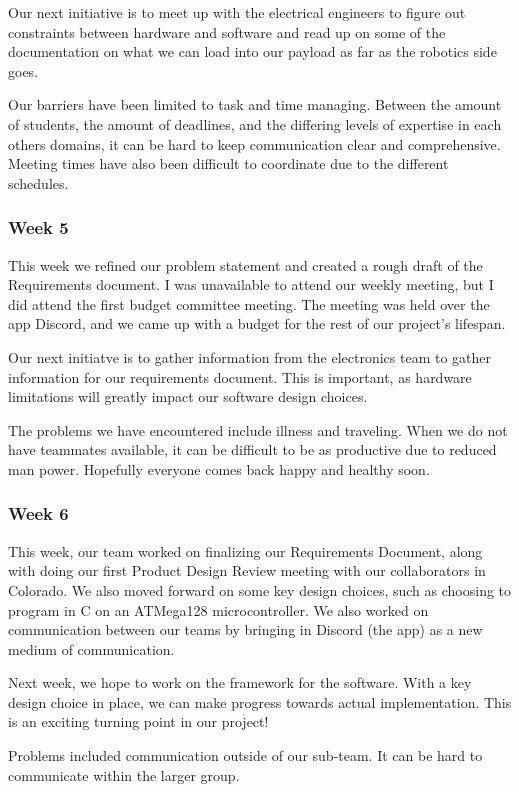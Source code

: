 Our next initiative is to meet up with the electrical engineers to figure out constraints between hardware and 
software and read up on some of the documentation on what we can load into our payload as far as the robotics side 
goes.

Our barriers have been limited to task and time managing. Between the amount of students, the amount of deadlines, and 
the differing levels of expertise in each others domains, it can be hard to keep communication clear and comprehensive.
Meeting times have also been difficult to coordinate due to the different schedules.

\subsubsection{Week 5}
This week we refined our problem statement and created a rough draft of the Requirements document. I was unavailable 
to attend our weekly meeting, but I did attend the first budget committee meeting. The meeting was held over the app 
Discord, and we came up with a budget for the rest of our project's lifespan.

Our next initiatve is to gather information from the electronics team to gather information for our requirements
document. This is important, as hardware limitations will greatly impact our software design choices.

The problems we have encountered include illness and traveling. When we do not have teammates available, it can be
difficult to be as productive due to reduced man power. Hopefully everyone comes back happy and healthy soon.

\subsubsection{Week 6}
This week, our team worked on finalizing our Requirements Document, along with doing our first Product Design Review 
meeting with our collaborators in Colorado. We also moved forward on some key design choices, such as choosing to 
program in C on an ATMega128 microcontroller. We also worked on communication between our teams by bringing in Discord 
(the app) as a new medium of communication.

Next week, we hope to work on the framework for the software. With a key design choice in place, we can make progress
towards actual implementation. This is an exciting turning point in our project!

Problems included communication outside of our sub-team. It can be hard to communicate within the larger group.

